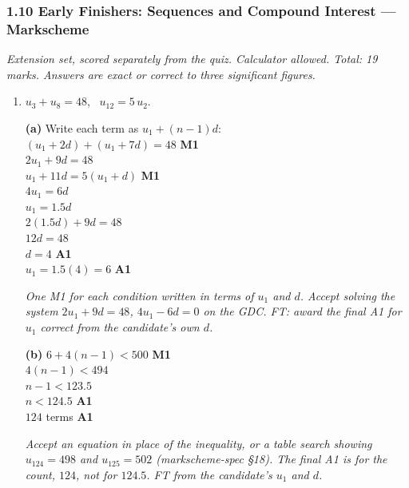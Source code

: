 \documentclass[12pt, twoside]{article}
\begin{document}
\subsubsection*{1.10 Early Finishers: Sequences and Compound Interest --- Markscheme}

\emph{Extension set, scored separately from the quiz. Calculator allowed.
Total: 19 marks. Answers are exact or correct to three significant
figures.}

\begin{enumerate}[itemsep=0.3cm]

\item[1.] [Maximum mark: 11]

$u_{3} + u_{8} = 48$, \ $u_{12} = 5\,u_{2}$.

\medskip

\textbf{(a)} Write each term as $u_{1} + (n - 1)d$: \\
$(u_{1} + 2d) + (u_{1} + 7d) = 48$ \hfill \textbf{M1} \\
$2u_{1} + 9d = 48$ \\
$u_{1} + 11d = 5(u_{1} + d)$ \hfill \textbf{M1} \\
$4u_{1} = 6d$ \\
$u_{1} = 1.5d$ \\
$2(1.5d) + 9d = 48$ \\
$12d = 48$ \\
$d = 4$ \hfill \textbf{A1} \\
$u_{1} = 1.5(4) = 6$ \hfill \textbf{A1}

\emph{One M1 for each condition written in terms of $u_{1}$ and $d$.
Accept solving the system $2u_{1} + 9d = 48$, $4u_{1} - 6d = 0$ on the
GDC. FT: award the final A1 for $u_{1}$ correct from the candidate's own
$d$.}

\medskip

\textbf{(b)} $6 + 4(n - 1) < 500$ \hfill \textbf{M1} \\
$4(n - 1) < 494$ \\
$n - 1 < 123.5$ \\
$n < 124.5$ \hfill \textbf{A1} \\
$124$ terms \hfill \textbf{A1}

\emph{Accept an equation in place of the inequality, or a table search
showing $u_{124} = 498$ and $u_{125} = 502$ (markscheme-spec §18). The
final A1 is for the count, $124$, not for $124.5$. FT from the
candidate's $u_{1}$ and $d$.}


\end{enumerate}
\end{document}
